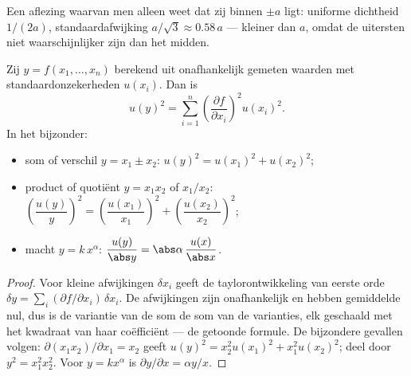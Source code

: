 \begin{omfigure}

{\small Een aflezing waarvan men alleen weet dat zij binnen $\pm a$ ligt:
uniforme dichtheid $1/(2a)$, standaardafwijking $a/\sqrt3 \approx 0.58\,a$ ---
kleiner dan $a$, omdat de uitersten niet waarschijnlijker zijn dan het midden.}
\end{omfigure}

\begin{theorem}\label{thm:b1:units-dimensions:propagation}
Zij $y = f(x_1, \dots, x_n)$ berekend uit onafhankelijk gemeten
waarden met standaardonzekerheden $u(x_i)$. Dan is
\[
u(y)^2 = \sum_{i=1}^n \left(\frac{\partial f}{\partial x_i}\right)^2 u(x_i)^2 .
\]
In het bijzonder:
\begin{itemize}
  \item som of verschil $y = x_1 \pm x_2$:
        $u(y)^2 = u(x_1)^2 + u(x_2)^2$;
  \item product of quotiënt $y = x_1 x_2$ of $x_1/x_2$:
        $\left(\dfrac{u(y)}{y}\right)^2 = \left(\dfrac{u(x_1)}{x_1}\right)^2
        + \left(\dfrac{u(x_2)}{x_2}\right)^2$;
  \item macht $y = k\,x^\alpha$: $\dfrac{u(y)}{\abs y} = \abs\alpha\,\dfrac{u(x)}{\abs x}$.
\end{itemize}
\end{theorem}

\begin{proof}
Voor kleine afwijkingen $\delta x_i$ geeft de taylorontwikkeling van eerste
orde $\delta y = \sum_i (\partial f/\partial x_i)\,\delta x_i$. De
afwijkingen zijn onafhankelijk en hebben gemiddelde nul, dus is de variantie
van de som de som van de varianties, elk geschaald met het kwadraat van haar
coëfficiënt --- de getoonde formule. De bijzondere gevallen volgen:
$\partial(x_1 x_2)/\partial x_1 = x_2$ geeft
$u(y)^2 = x_2^2 u(x_1)^2 + x_1^2 u(x_2)^2$; deel door $y^2 = x_1^2 x_2^2$.
Voor $y = kx^\alpha$ is $\partial y/\partial x = \alpha y/x$.
\end{proof}


